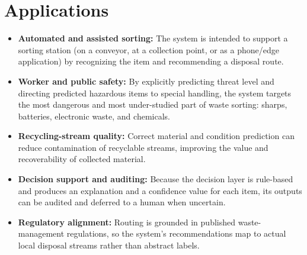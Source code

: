 \section{Applications}
\begin{itemize}
    \item \textbf{Automated and assisted sorting:} The system is intended to support a sorting station (on a conveyor, at a collection point, or as a phone/edge application) by recognizing the item and recommending a disposal route.

    \item \textbf{Worker and public safety:} By explicitly predicting threat level and directing predicted hazardous items to special handling, the system targets the most dangerous and most under-studied part of waste sorting: sharps, batteries, electronic waste, and chemicals.

    \item \textbf{Recycling-stream quality:} Correct material and condition prediction can reduce contamination of recyclable streams, improving the value and recoverability of collected material.

    \item \textbf{Decision support and auditing:} Because the decision layer is rule-based and produces an explanation and a confidence value for each item, its outputs can be audited and deferred to a human when uncertain.

    \item \textbf{Regulatory alignment:} Routing is grounded in published waste-management regulations, so the system's recommendations map to actual local disposal streams rather than abstract labels.
\end{itemize}

